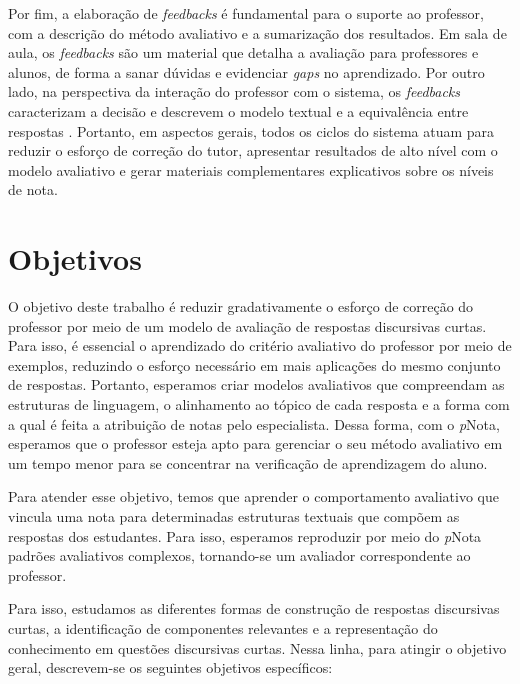 Por fim, a elaboração de \textit{feedbacks} é fundamental para o suporte ao professor, com a descrição do método avaliativo e a sumarização dos resultados. Em sala de aula, os \textit{feedbacks} são um material que detalha a avaliação para professores e alunos, de forma a sanar dúvidas e evidenciar \textit{gaps} no aprendizado. Por outro lado, na perspectiva da interação do professor com o sistema, os \textit{feedbacks} caracterizam a decisão e descrevem o modelo textual e a equivalência entre respostas \cite{bernius2022}. Portanto, em aspectos gerais, todos os ciclos do sistema atuam para reduzir o esforço de correção do tutor, apresentar resultados de alto nível com o modelo avaliativo e gerar materiais complementares explicativos sobre os níveis de nota.

\section{Objetivos} \label{cap1-objetivos}

O objetivo deste trabalho é reduzir gradativamente o esforço de correção do professor por meio de um modelo de avaliação de respostas discursivas curtas. Para isso, é essencial o aprendizado do critério avaliativo do professor por meio de exemplos, reduzindo o esforço necessário em mais aplicações do mesmo conjunto de respostas. Portanto, esperamos criar modelos avaliativos que compreendam as estruturas de linguagem, o alinhamento ao tópico de cada resposta e a forma com a qual é feita a atribuição de notas pelo especialista. Dessa forma, com o \textit{p}Nota, esperamos que o professor esteja apto para gerenciar o seu método avaliativo em um tempo menor para se concentrar na verificação de aprendizagem do aluno.

Para atender esse objetivo, temos que aprender o comportamento avaliativo que vincula uma nota para determinadas estruturas textuais que compõem as respostas dos estudantes. Para isso, esperamos reproduzir por meio do \textit{p}Nota padrões avaliativos complexos, tornando-se um avaliador correspondente ao professor.

Para isso, estudamos as diferentes formas de construção de respostas discursivas curtas, a identificação de componentes relevantes e a representação do conhecimento em questões discursivas curtas. Nessa linha, para atingir o objetivo geral, descrevem-se os seguintes objetivos específicos:

